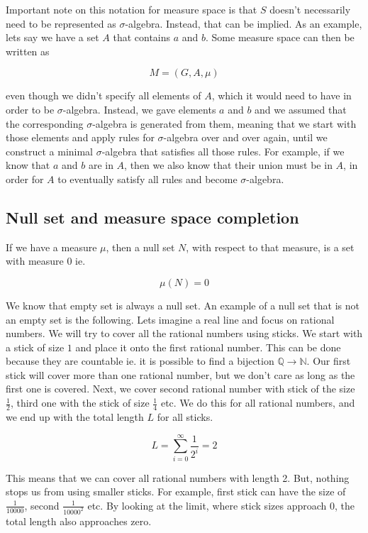 \documentclass{article}
\begin{document}
Important note on this notation for measure space is that $S$ doesn't necessarily need to be represented as $\sigma$-algebra. Instead, that can be implied. As an example, lets say we have a set $A$ that contains $a$ and $b$. Some measure space can then be written as

\[ M=(G,A,\mu) \]

even though we didn't specify all elements of $A$, which it would need to have in order to be $\sigma$-algebra. Instead, we gave elements $a$ and $b$ and we assumed that the corresponding $\sigma$-algebra is generated from them, meaning that we start with those elements and apply rules for $\sigma$-algebra over and over again, until we construct a minimal $\sigma$-algebra that satisfies all those rules. For example, if we know that $a$ and $b$ are in $A$, then we also know that their union must be in $A$, in order for $A$ to eventually satisfy all rules and become $\sigma$-algebra.

\subsection{Null set and measure space completion}
If we have a measure $\mu$, then a null set $N$, with respect to that measure, is a set with measure 0 ie.

\[ \mu(N) = 0 \]

We know that empty set is always a null set. An example of a null set that is not an empty set is the following. Lets imagine a real line and focus on rational numbers. We will try to cover all the rational numbers using sticks. We start with a stick of size $1$ and place it onto the first rational number. This can be done because they are countable ie. it is possible to find a bijection $\mathbb{Q}\to\mathbb{N}$. Our first stick will cover more than one rational number, but we don't care as long as the first one is covered. Next, we cover second rational number with stick of the size $\frac{1}{2}$, third one with the stick of size $\frac{1}{4}$ etc. We do this for all rational numbers, and we end up with the total length $L$ for all sticks.

\[ L=\sum_{i=0}^{\infty}\frac{1}{2^i}=2\]

This means that we can cover all rational numbers with length 2. But, nothing stops us from using smaller sticks. For example, first stick can have the size of $\frac{1}{10000}$, second $\frac{1}{10000^2}$ etc. By looking at the limit, where stick sizes approach 0, the total length also approaches zero.
\end{document}
